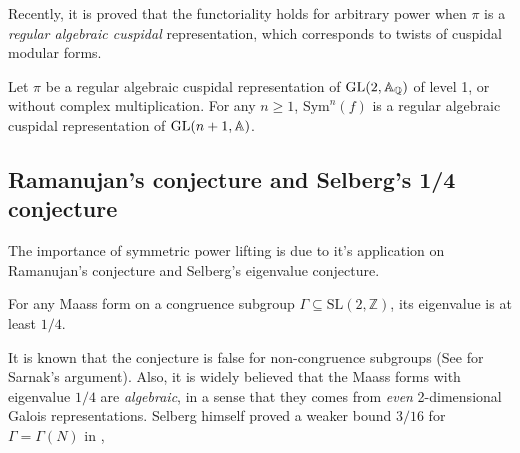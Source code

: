 Recently, it is proved that the functoriality holds for arbitrary power when $\pi$ is a \emph{regular algebraic cuspidal} representation, which corresponds to twists of cuspidal modular forms.
\begin{theorem}
Let $\pi$ be a regular algebraic cuspidal representation of $\operatorname{\mathrm{GL}}(2, \mathbb{A}_{\mathbb{Q}})$ of level 1, or without complex multiplication.
For any $n\geq 1$, $\mathrm{Sym}^{n}(f)$ is a regular algebraic cuspidal representation of $\operatorname{\mathrm{GL}}(n + 1, \mathbb{A})$.
\end{theorem}


\subsection{Ramanujan's conjecture and Selberg's 1/4 conjecture}

The importance of symmetric power lifting is due to it's application on Ramanujan's conjecture and Selberg's eigenvalue conjecture.

\begin{conjecture}
For any Maass form on a congruence subgroup $\Gamma \subseteq \mathrm{SL}(2, \mathbb{Z})$, its eigenvalue is at least $1/4$.
\end{conjecture}
It is known that the conjecture is false for non-congruence subgroups (See \cite{sarnak1995selberg} for Sarnak's argument). 
Also, it is widely believed that the Maass forms with eigenvalue $1/4$ are \emph{algebraic}, in a sense that they comes from \emph{even} 2-dimensional Galois representations.
Selberg himself proved a weaker bound $3/16$ for $\Gamma = \Gamma(N)$ in \cite{selberg1965estimation}, 

